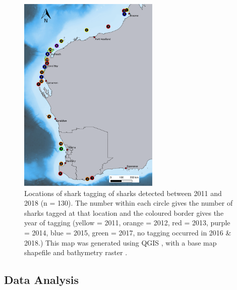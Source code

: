 \documentclass[11pt,a4paper]{article}
\begin{document}
\begin{figure}
	\centering\includegraphics[width=0.6\textwidth]{../Results/Release_map.pdf}
	\caption{Locations of shark tagging of sharks detected between 2011 and 2018 (n = 130). The number within each circle gives the number of sharks tagged at that location and the coloured border gives the year of tagging (yellow = 2011, orange = 2012, red = 2013, purple = 2014, blue = 2015, green = 2017, no tagging occurred in 2016 \& 2018.) This map was generated using QGIS \citep{QGISDevelopmentTeam2019}, with a base map shapefile \citep{AustralianBureauofStatistics2011} and bathymetry raster \citep{Whiteway2009}.}
	\label{releases}
\end{figure}


	\subsection{Data Analysis}
	
\end{document}
